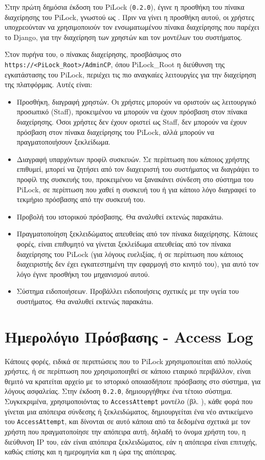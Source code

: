 Στην πρώτη δημόσια έκδοση του PiLock (\verb|0.2.0|), έγινε η προσθήκη του πίνακα διαχείρησης του PiLock, γνωστού ως . Πριν να γίνει η προσθήκη αυτού, οι χρήστες υποχρεούνταν να χρησιμοποιούν τον ενσωματωμένου πίνακα διαχείρησης που παρέχει το Django, για την διαχείρηση των χρηστών και τον μοντέλων του συστήματος.

Στον πυρήνα του, ο πίνακας διαχείρησης, προσβάσιμος στο \verb|https://<PiLock_Root>/AdminCP|, όπου PiLock\_Root η διεύθυνση της εγκατάστασης του PiLock, περιέχει τις πιο αναγκαίες λειτουργίες για την διαχείρηση της πλατφόρμας. Αυτές είναι:

\begin{itemize}
	\item Προσθήκη, διαγραφή χρηστών. Οι χρήστες μπορούν να οριστούν ως λειτουργικό προσωπικό (Staff), προκειμένου να μπορούν να έχουν πρόσβαση στον πίνακα διαχείρησης. Όσοι χρήστες δεν έχουν οριστεί ως Staff, δεν μπορούν να έχουν πρόσβαση στον πίνακα διαχείρησης του PiLock, αλλά μπορούν να πραγματοποιήσουν ξεκλείδωμα.
	\item Διαγραφή υπαρχόντων προφίλ συσκευών. Σε περίπτωση που κάποιος χρήστης επιθυμεί, μπορεί να ζητήσει από τον διαχειριστή του συστήματος να διαγράψει το προφίλ της συσκευής του, προκειμένου να ξανακάνει σύνδεση στο σύστημα του PiLock, σε περίπτωση που χαθεί η συσκευή του ή για κάποιο λόγο διαγραφεί το τεκμήριο πρόσβασης από την συσκευή του.
	\item Προβολή του ιστορικού πρόσβασης. Θα αναλυθεί εκτενώς παρακάτω.
	\item Πραγματοποίηση ξεκλειδώματος απευθείας από τον πίνακα διαχείρησης. Κάποιες φορές, είναι επιθυμητό να γίνεται ξεκλείδωμα απευθείας από τον πίνακα διαχείρησης του PiLock (για λόγους ευελιξίας, ή σε περίπτωση που κάποιος διαχειριστής δεν έχει εγκατεστημένη την εφαρμογή στο κινητό του), για αυτό τον λόγο έγινε προσθήκη του μηχανισμού αυτού.  %
	\item Σύστημα ειδοποιήσεων. Προβάλλει ειδοποιήσεις σχετικές με την υγεία του συστήματος. Θα αναλυθεί εκτενώς παρακάτω.
\end{itemize}

\section{Ημερολόγιο Πρόσβασης - Access Log}
	Κάποιες φορές, ειδικά σε περιπτώσεις που το PiLock χρησιμοποιείται από πολλούς χρήστες, ή σε περίπτωση που χρησιμοποιηθεί σε κάποιο εταιρικό περιβάλλον, είναι θεμιτό να κρατείται αρχείο με το ιστορικό οποιασδήποτε πρόσβασης στο σύστημα, για λόγους ασφαλείας. Στην έκδοση \verb|0.2.0|, δημιουργήθηκε ένα τέτοιο σύστημα. Συγκεκριμένα, χρησιμοποιόντας το \verb|AccessAttempt| μοντέλο (βλ. ), κάθε φορά που γίνεται μια απόπειρα σύνδεσης ή ξεκλειδώματος, δημιουργείται ένα νέο αντικείμενο του \verb|AccessAttempt|, και δίνονται σε αυτό κάποια από τα δεδομένα σχετικά με τον χρήστη που πραγματοποίησε την απόπειρα αυτή, δηλαδή το όνομα χρήστη του, η διεύθυνση IP του, εάν είναι απόπειρα ξεκλειδώματος, εάν η απόπειρα είναι επιτυχής, καθώς επίσης και η ημερομηνία και η ώρα της απόπειρας.

